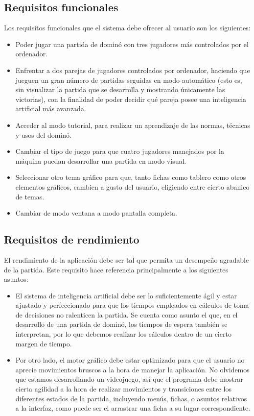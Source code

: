 \subsection{Requisitos funcionales}

Los requisitos funcionales que el sistema debe ofrecer al usuario son los siguientes:
\begin{itemize}
    \item Poder jugar una partida de dominó con tres jugadores más controlados por el ordenador.
    \item Enfrentar a dos parejas de jugadores controlados por ordenador, haciendo que jueguen un gran número
            de partidas seguidas en modo automático (esto es, sin visualizar la partida que se desarrolla y
            mostrando únicamente las victorias), con la finalidad de poder decidir qué pareja posee una
            inteligencia artificial más avanzada.
    \item Acceder al modo tutorial, para realizar un aprendizaje de las normas, técnicas y usos del dominó.
    \item Cambiar el tipo de juego para que cuatro jugadores manejados por la máquina puedan desarrollar una
            partida en modo visual.
    \item Seleccionar otro tema gráfico para que, tanto fichas como tablero como otros elementos gráficos, cambien
            a gusto del usuario, eligiendo entre cierto abanico de temas.
    \item Cambiar de modo ventana a modo pantalla completa.
\end{itemize}


\subsection{Requisitos de rendimiento}

El rendimiento de la aplicación debe ser tal que permita un desempeño agradable de la partida. Este requisito
hace referencia principalmente a los siguientes asuntos:
\begin{itemize}
    \item El sistema de inteligencia artificial debe ser lo suficientemente ágil y estar ajustado y
            perfeccionado para que los tiempos empleados en cálculos de toma de decisiones no ralenticen
            la partida. Se cuenta como asunto el que, en el desarrollo de una partida de dominó, los tiempos de
            espera también se interpretan, por lo que debemos realizar los cálculos dentro de un cierto
            margen de tiempo.
    \item Por otro lado, el motor gráfico debe estar optimizado para que el usuario no aprecie movimientos
            bruscos a la hora de manejar la aplicación. No olvidemos que estamos desarrollando un videojuego,
            así que el programa debe mostrar cierta agilidad a la hora de realizar movimientos y transiciones
            entre los diferentes estados de la partida, incluyendo menús, fichas, o asuntos relativos a la
            interfaz, como puede ser el arrastrar una ficha a su lugar correspondiente.
\end{itemize}

